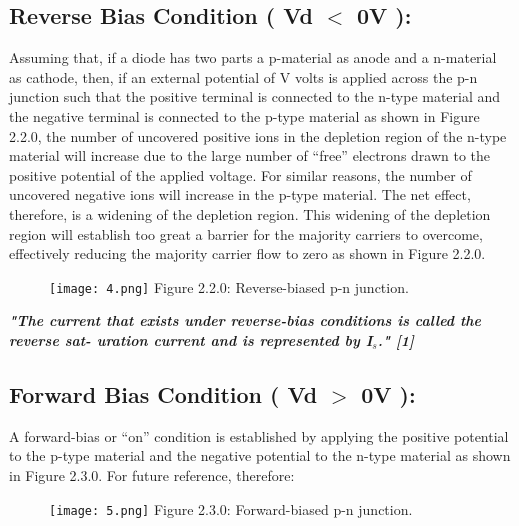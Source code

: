 \documentclass[10pt,a4paper]{article}
\begin{document}
\subsection{Reverse Bias Condition ( Vd $<$ 0V ):}

Assuming that, if a diode has two parts a p-material as anode and a n-material as cathode, then, if an external potential of V volts is applied across the p-n junction such that the positive terminal is connected to the n-type material and the negative terminal is connected to the p-type material as shown in Figure 2.2.0, the number of uncovered positive ions in the depletion region of the n-type material will increase due to the large number of “free” electrons drawn to the positive potential of the applied voltage. For similar reasons, the number of uncovered negative ions will increase in the p-type material. The net effect, therefore, is a widening of the depletion region. This widening of the depletion region will establish too great a barrier for the majority carriers to overcome, effectively reducing the majority carrier flow to zero as shown in Figure 2.2.0.

\begin{figure}[H]
\texttt{[image: 4.png]}
\centering \linebreak \linebreak Figure 2.2.0: Reverse-biased  p-n junction.
\end{figure}

\textbf{\textit{\Large {"The current that exists under reverse-bias conditions is called the reverse sat- uration current and is represented by I$_{s}$." [1] }}}

\pagebreak

\subsection{Forward Bias Condition ( Vd $>$ 0V ):}

A forward-bias or “on” condition is established by applying the positive potential to the p-type material and the negative potential to the n-type material as shown in Figure 2.3.0. For future reference, therefore:

\begin{figure}[H]
\texttt{[image: 5.png]}
\centering \linebreak \linebreak Figure 2.3.0: Forward-biased  p-n junction.
\end{figure}
\end{document}
